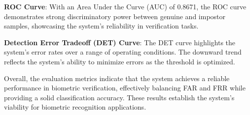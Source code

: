 \textbf{ROC Curve}: With an Area Under the Curve (AUC) of 0.8671, the ROC curve demonstrates strong discriminatory power between genuine and impostor samples, showcasing the system's reliability in verification tasks.

\textbf{Detection Error Tradeoff (DET) Curve}: The DET curve highlights the system's error rates over a range of operating conditions. The downward trend reflects the system's ability to minimize errors as the threshold is optimized.

Overall, the evaluation metrics indicate that the system achieves a reliable performance in biometric verification, effectively balancing FAR and FRR while providing a solid classification accuracy. These results establish the system's viability for biometric recognition applications.
